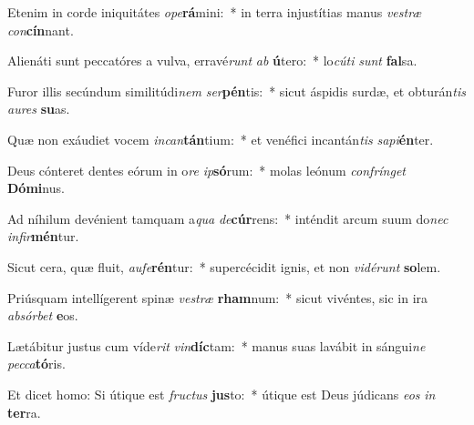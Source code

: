 \item Etenim in corde iniquitátes \textit{o}\textit{pe}\textbf{rá}mini:~* in terra injustítias manus \textit{ves}\textit{træ} \textit{con}\textbf{cín}nant.
\item Alienáti sunt peccatóres a vulva, erravé\textit{runt} \textit{ab} \textbf{ú}tero:~* lo\textit{cú}\textit{ti} \textit{sunt} \textbf{fal}sa.
\item Furor illis secúndum similitúdi\textit{nem} \textit{ser}\textbf{pén}tis:~* sicut áspidis surdæ, et obturán\textit{tis} \textit{au}\textit{res} \textbf{su}as.
\item Quæ non exáudiet vocem \textit{in}\textit{can}\textbf{tán}tium:~* et venéfici incantán\textit{tis} \textit{sa}\textit{pi}\textbf{én}ter.
\item Deus cónteret dentes eórum in o\textit{re} \textit{ip}\textbf{só}rum:~* molas leónum \textit{con}\textit{frín}\textit{get} \textbf{Dó}\textbf{mi}nus.
\item Ad níhilum devénient tamquam a\textit{qua} \textit{de}\textbf{cúr}rens:~* inténdit arcum suum do\textit{nec} \textit{in}\textit{fir}\textbf{mén}tur.
\item Sicut cera, quæ fluit, \textit{au}\textit{fe}\textbf{rén}tur:~* supercécidit ignis, et non \textit{vi}\textit{dé}\textit{runt} \textbf{so}lem.
\item Priúsquam intellígerent spinæ \textit{ves}\textit{træ} \textbf{rham}num:~* sicut vivéntes, sic in ira \textit{ab}\textit{sór}\textit{bet} \textbf{e}os.
\item Lætábitur justus cum víde\textit{rit} \textit{vin}\textbf{díc}tam:~* manus suas lavábit in sángui\textit{ne} \textit{pec}\textit{ca}\textbf{tó}ris.
\item Et dicet homo: Si útique est \textit{fruc}\textit{tus} \textbf{jus}to:~* útique est Deus júdicans \textit{e}\textit{os} \textit{in} \textbf{ter}ra.
